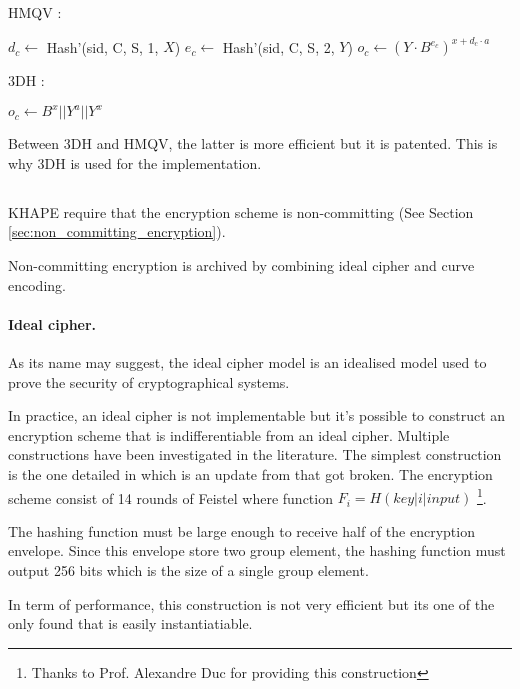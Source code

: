 \documentclass[../report.tex]{subfiles}
\begin{document}
HMQV :
\begin{algorithmic}
\State $d_c \gets$ Hash'(sid, C, S, 1, $X$)
\State $e_c \gets$ Hash'(sid, C, S, 2, $Y$)
\State $o_c \gets (Y \cdot B^{e_c})^{x+d_c \cdot a}$
\end{algorithmic}

3DH :
\begin{algorithmic}
\State $o_c \gets B^x || Y^a || Y^x$
\end{algorithmic}

Between 3DH and HMQV, the latter is more efficient but it is patented. This is why 3DH is used for the implementation.





\subsection{}
KHAPE require that the encryption scheme is non-committing (See Section \ref{sec:non_committing_encryption}).

Non-committing encryption is archived by combining ideal cipher and curve encoding.

\paragraph{Ideal cipher.}
As its name may suggest, the ideal cipher model is an idealised model used to prove the security of cryptographical systems.

In practice, an ideal cipher is not implementable %
but it's possible to construct an encryption scheme that is indifferentiable from an ideal cipher. Multiple constructions have been investigated in the literature.
The simplest construction is the one detailed in \cite{Ideal_Cipher_2} which is an update from \cite{Ideal_Cipher_1} that got broken.
The encryption scheme consist of 14 rounds of Feistel where function $F_i = H(key | i | input)$ \footnote{Thanks to Prof. Alexandre Duc for providing this construction}.

The hashing function must be large enough to receive half of the encryption envelope. Since this envelope store two group element, the hashing function must output 256 bits which is the size of a single group element.

In term of performance, this construction is not very efficient but its one of the only found that is easily instantiatiable.
\end{document}
